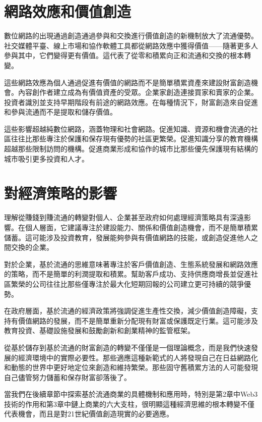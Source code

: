 \documentclass[
  Letterpaper,
]{scrbook}
\begin{document}
\section{網路效應和價值創造}\label{ux7db2ux8defux6548ux61c9ux548cux50f9ux503cux5275ux9020}

數位網路的出現通過創造通過參與和交換進行價值創造的新機制放大了流通優勢。社交媒體平臺、線上市場和協作軟體工具都從網路效應中獲得價值------隨著更多人參與其中，它們變得更有價值。這代表了從零和積累向正和流通和交換的根本轉變。

這些網路效應為個人通過促進有價值的網路而不是簡單積累資產來建設財富創造機會。內容創作者建立成為有價值資產的受眾。企業家創造連接買家和賣家的企業。投資者識別並支持早期階段有前途的網路效應。在每種情況下，財富創造來自促進和參與流通而不是提取和儲存價值。

這些影響超越純數位網路，涵蓋物理和社會網路。促進知識、資源和機會流通的社區往往比那些專注於保護和保存現有優勢的社區更繁榮。促進知識分享的教育機構超越那些限制訪問的機構。促進商業形成和協作的城市比那些優先保護現有結構的城市吸引更多投資和人才。

\section{對經濟策略的影響}\label{ux5c0dux7d93ux6fdfux7b56ux7565ux7684ux5f71ux97ff}

理解從賺錢到賺流通的轉變對個人、企業甚至政府如何處理經濟策略具有深遠影響。在個人層面，它建議專注於建設能力、關係和價值創造機會，而不是簡單積累儲蓄。這可能涉及投資教育，發展能夠參與有價值網路的技能，或創造促進他人之間交換的企業。

對於企業，基於流通的思維意味著專注於客戶價值創造、生態系統發展和網路效應的策略，而不是簡單的利潤提取和積累。幫助客戶成功、支持供應商增長並促進社區繁榮的公司往往比那些僅專注於最大化短期回報的公司建立更可持續的競爭優勢。

在政府層面，基於流通的經濟政策將強調促進生產性交換，減少價值創造障礙，支持有價值網路的發展，而不是簡單重新分配現有財富或保護既定行業。這可能涉及教育投資、基礎設施發展和鼓勵創新和創業精神的監管框架。

從基於儲存到基於流通的財富創造的轉變不僅僅是一個理論概念，而是我們快速發展的經濟環境中的實際必要性。那些適應這種新範式的人將發現自己在日益網路化和動態的世界中更好地定位來創造和維持繁榮。那些固守舊積累方法的人可能發現自己儘管努力儲蓄和保存財富卻落後了。

當我們在後續章節中探索基於流通商業的具體機制和應用時，特別是第2章中Web3技術的作用和第3章中鏈上商業的六大支柱，很明顯這種經濟思維的根本轉變不僅代表機會，而且是對21世紀價值創造現實的必要適應。
\end{document}
